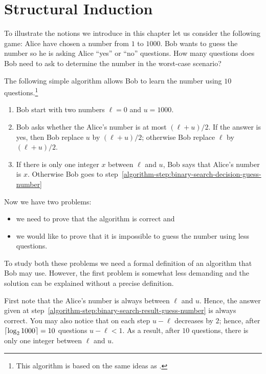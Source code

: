 \chapter{Structural Induction}
\label{chapter:structural-induciton}
To illustrate the notions we introduce in this chapter let us consider the
following game: Alice have chosen a number from $1$ to $1000$. Bob wants to
guess the number so he is asking Alice ``yes'' or ``no'' questions.
How many questions does Bob need to ask to determine the number in the
worst-case scenario?

The following simple algorithm allows Bob to learn the number using $10$
questions.\footnote{%
  This algorithm is based on the same ideas as .
}
\begin{enumerate}
  \item Bob start with two numbers $\ell = 0$ and $u = 1000$.
  \item \label{algorithm-step:binary-search-decision-guess-number}
    Bob asks whether the Alice's number is at most $(\ell + u) / 2$.
    If the answer is yes, then Bob replace $u$ by $(\ell + u) / 2$;
    otherwise Bob replace $\ell$ by $(\ell + u) / 2$.
  \item \label{algorithm-step:binary-search-result-guess-number}
    If there is only one integer $x$ between $\ell$ and $u$, Bob
    says that Alice's number is $x$. Otherwise Bob goes to
    step~\ref{algorithm-step:binary-search-decision-guess-number}
\end{enumerate}

Now we have two problems:
\begin{itemize}
  \item we need to prove that the algorithm is correct and
  \item we would like to prove that it is impossible to guess the number
    using less questions.
\end{itemize}

To study both these problems we need a formal definition of an algorithm that
Bob may use. However, the first problem is somewhat less demanding and
the solution can be explained without a precise definition.

First note that the Alice's number is always between $\ell$ and $u$. Hence,
the answer given at step~\ref{algorithm-step:binary-search-result-guess-number}
is always correct. You may also notice that on each step $u - \ell$
decreases by $2$; hence, after $\left\lceil {\log_2 1000} \right\rceil = 10$ questions $u - \ell < 1$.
As a result, after $10$ questions, there is only one integer between $\ell$ and
$u$.

